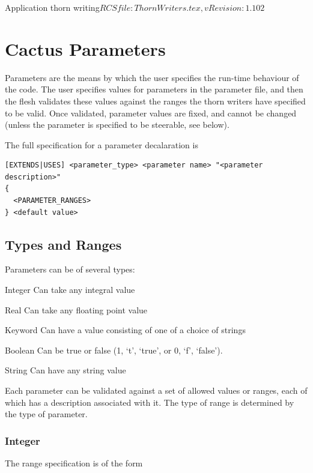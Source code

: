 \begin{cactuspart}{2}{Application thorn writing}{$RCSfile: ThornWriters.tex,v $}{$Revision: 1.102 $}

\chapter{Cactus Parameters}

Parameters are the means by which the user specifies the run-time behaviour of
the code.  The user specifies values for parameters in the parameter file, and
then the flesh validates these values against the ranges the thorn writers have
specified to be valid.  Once validated, parameter values are fixed, and cannot
be changed (unless the parameter is specified to be steerable, see below).

The full specification for a parameter decalaration is
\begin{verbatim}
[EXTENDS|USES] <parameter_type> <parameter name> "<parameter description>"
{
  <PARAMETER_RANGES>
} <default value>
\end{verbatim}

\section{Types and Ranges}

Parameters can be of several types:

\begin{Lentry}
\item[Integer]  Can take any integral value
\item[Real] Can take any floating point value
\item[Keyword] Can have a value consisting of one of a choice of strings
\item[Boolean] Can be true or false (1, `t', `true', or 0, `f', `false').
\item[String] Can have any string value
\end{Lentry}

Each parameter can be validated against a set of allowed values or
ranges, each of which has a description associated with it.  The type
of range is determined by the type of parameter.

\subsection{Integer}

The range specification is of the form


\end{cactuspart}
